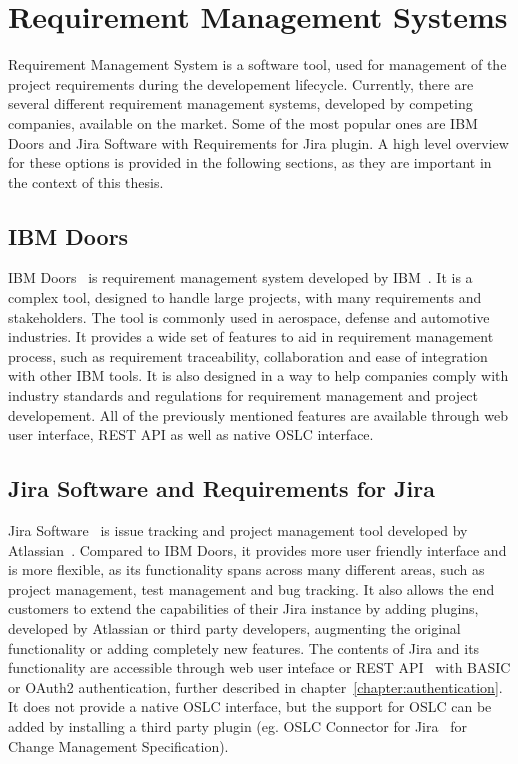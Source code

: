 \section{Requirement Management Systems}
Requirement Management System is a software tool, used for management of the project requirements during the developement lifecycle. Currently, there are several different requirement management systems, developed by competing companies, available on the market. Some of the most popular ones are IBM Doors and Jira Software with Requirements for Jira plugin. A high level overview for these options is provided in the following sections, as they are important in the context of this thesis.

\subsection*{IBM Doors}
IBM Doors \cite{ibm_doors} is requirement management system developed by IBM \cite{ibm}. It is a complex tool, designed to handle large projects, with many requirements and stakeholders. The tool is commonly used in aerospace, defense and automotive industries. It provides a wide set of features to aid in requirement management process, such as requirement traceability, collaboration and ease of integration with other IBM tools. It is also designed in a way to help companies comply with industry standards and regulations for requirement management and project developement. All of the previously mentioned features are available through web user interface, REST API as well as native OSLC interface.

\subsection*{Jira Software and Requirements for Jira}
Jira Software \cite{jira} is issue tracking and project management tool developed by Atlassian \cite{atlassian}. Compared to IBM Doors, it provides more user friendly interface and is more flexible, as its functionality spans across many different areas, such as project management, test management and bug tracking. It also allows the end customers to extend the capabilities of their Jira instance by adding plugins, developed by Atlassian or third party developers, augmenting the original functionality or adding completely new features. The contents of Jira and its functionality are accessible through web user inteface or REST API \cite{jira_api} with BASIC or OAuth2 authentication, further described in chapter \ref{chapter:authentication}. It does not provide a native OSLC interface, but the support for OSLC can be added by installing a third party plugin (eg. OSLC Connector for Jira \cite{oslc_connector_for_jira} for Change Management Specification).

